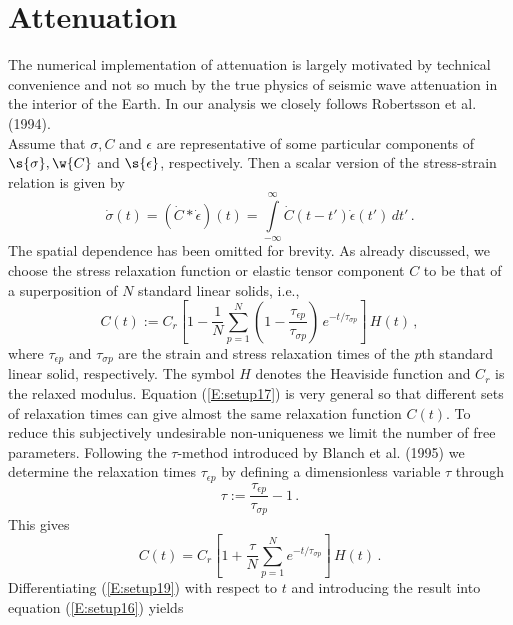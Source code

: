 \section{Attenuation}\label{S:attenuation}

The numerical implementation of attenuation is largely motivated by
technical convenience and not so much by the true physics of seismic
wave attenuation in the interior of the Earth. In our analysis we closely follows Robertsson et al. (1994).\\
Assume that $\sigma, C$ and $\epsilon$ are representative of some
particular components of $\s{\sigma}, \w{C}$ and $\s{\epsilon}$,
respectively. Then a scalar version of the stress-strain relation is
given by
\begin{equation}\label{E:setup16}
\dot{\sigma}(t) = (\dot{C}*\dot{\epsilon})(t) =
\int\limits_{-\infty}^{\infty} \dot{C}(t-t') \dot{\epsilon}(t')\,
dt'\,.
\end{equation}
The spatial dependence has been omitted for brevity. As already
discussed, we choose the stress relaxation function or elastic
tensor component $C$ to be that of a superposition of $N$ standard
linear solids, i.e.,
\begin{equation}\label{E:setup17}
C(t) := C_r \left[ 1- \frac{1}{N} \sum_{p=1}^{N} \left( 1-
\frac{\tau_{\epsilon p}}{\tau_{\sigma p}}\right)\,e^{-t/\tau_{\sigma
p}}\right] \, H(t)\,,
\end{equation}
where $\tau_{\epsilon p}$ and $\tau_{\sigma p}$ are the strain and
stress relaxation times of the $p$th standard linear solid,
respectively. The symbol $H$ denotes the Heaviside function and
$C_r$ is the relaxed modulus. Equation (\ref{E:setup17}) is very
general so that  different sets of relaxation times can give almost
the same relaxation function $C(t)$. To reduce this subjectively
undesirable non-uniqueness we limit the number of free parameters.
Following the $\tau$-method introduced by Blanch et al. (1995) we
determine the relaxation times $\tau_{\epsilon p}$ by defining a
dimensionless variable $\tau$ through
\begin{equation}\label{E:setup18}
\tau := \frac{\tau_{\epsilon p}}{\tau_{\sigma p}} -1\, .
\end{equation}
This gives
\begin{equation}\label{E:setup19}
C(t) = C_r \left[ 1+\frac{\tau}{N} \sum_{p=1}^{N} e^{-t/\tau_{\sigma
p}} \right]\, H(t)\,.
\end{equation}
Differentiating (\ref{E:setup19}) with respect to $t$ and
introducing the result into equation (\ref{E:setup16}) yields
